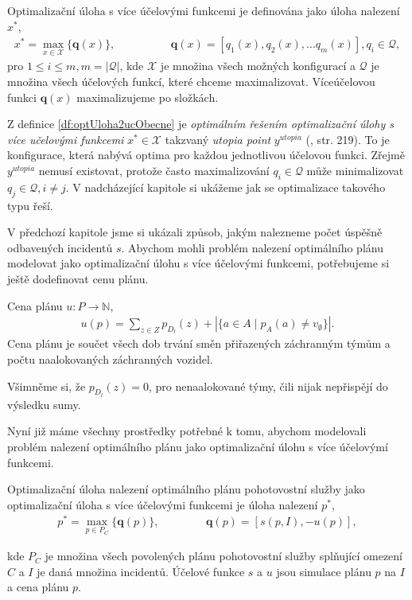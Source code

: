 \begin{definice}\label{df:optUloha2ucObecne}
  Optimalizační úloha s více účelovými funkcemi je definována jako úloha nalezení $x^*$,
  \begin{align*}
    x^* = \max_{x \in \mathcal{X}} \{ \mathbf{q}(x) \}, \hspace{50pt} &\mathbf{q}(x) = [q_1(x), q_2(x), \dots q_{m}(x)], q_i \in \mathcal{Q},
  \end{align*}
  pro $1 \leq i \leq m, m = |\mathcal{Q}|$,
  kde $\mathcal{X}$ je množina všech možných konfigurací a $\mathcal{Q}$ je množina všech účelových funkcí, které chceme maximalizovat.
  Víceúčelovou funkci $\mathbf{q}(x)$ maximalizujeme po složkách.
\end{definice}
Z definice \ref{df:optUloha2ucObecne} je \textit{optimálním řešením optimalizační úlohy s více učelovými funkcemi}
$x^* \in \mathcal{X}$ takzvaný \textit{utopia point} $y^{utopia}$ (\cite{AlgOptBook}, str. 219).
To je konfigurace, která nabývá optima pro každou jednotlivou účelovou funkci.
Zřejmě $y^{utopia}$ nemusí existovat, protože často maximalizování $q_i \in \mathcal{Q}$ může minimalizovat $q_j \in \mathcal{Q}, i \neq j$.
V nadcházející kapitole si ukážeme jak se optimalizace takového typu řeší.

V předchozí kapitole jsme si ukázali způsob, jakým nalezneme počet úspěšně odbavených incidentů $s$. 
Abychom mohli problém nalezení optimálního plánu modelovat jako optimalizační úlohu s více účelovými funkcemi, potřebujeme si ještě dodefinovat cenu plánu.
\begin{definice}\label{df:cenaPlanu}
  Cena plánu $u \colon P \rightarrow \mathbb{N}$,
  \begin{align*}
    u(p) = \sum_{z \in Z} p_{D_l}(z) + |\{ a \in A \mid p_{A}(a) \neq v_{\emptyset} \}|.
  \end{align*}
  Cena plánu je součet všech dob trvání směn přiřazených záchranným týmům a počtu naalokovaných záchranných vozidel.
\end{definice}

Všimněme si, že $p_{D_l}(z) = 0$, pro nenaalokované týmy, čili nijak nepřispějí do výsledku sumy.

Nyní již máme všechny prostředky potřebné k tomu, abychom modelovali problém nalezení optimálního plánu jako optimalizační úlohu s více účelovýmí funkcemi. 
\begin{definice}\label{df:optUloha2uc}
  Optimalizační úloha nalezení optimálního plánu pohotovostní služby jako optimalizační úloha s více účelovými funkcemi je úloha nalezení $p^*$,
  \begin{align*}
    p^* = \max_{p \in P_C} \{ \mathbf{q}(p) \}, \hspace{50pt} \mathbf{q}(p) = [s(p, I), -u(p)],
  \end{align*}

  kde $P_C$ je množina všech povolených plánu pohotovostní služby splňující omezení $C$ a $I$ je daná množina incidentů.
  Účelové funkce $s$ a $u$ jsou simulace plánu $p$ na $I$ a cena plánu $p$.
\end{definice}

